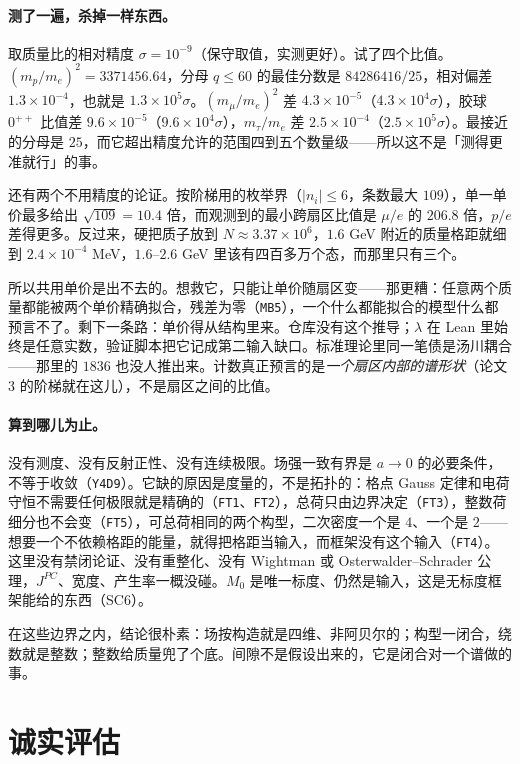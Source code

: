 \documentclass[aps,prd,preprint,superscriptaddress,amsmath,amssymb]{revtex4-2}
\begin{document}
\paragraph{测了一遍，杀掉一样东西。}
取质量比的相对精度 $\sigma=10^{-9}$（保守取值，实测更好）。试了四个比值。$(m_p/m_e)^2=3371456.64$，分母 $q\le60$ 的最佳分数是 $84286416/25$，相对偏差 $1.3\times10^{-4}$，也就是 $1.3\times10^{5}\sigma$。$(m_\mu/m_e)^2$ 差 $4.3\times10^{-5}$（$4.3\times10^{4}\sigma$），胶球 $0^{++}$ 比值差 $9.6\times10^{-5}$（$9.6\times10^{4}\sigma$），$m_\tau/m_e$ 差 $2.5\times10^{-4}$（$2.5\times10^{5}\sigma$）。最接近的分母是 $25$，而它超出精度允许的范围四到五个数量级——所以这不是「测得更准就行」的事。

还有两个不用精度的论证。按阶梯用的枚举界（$|n_i|\le6$，条数最大 $109$），单一单价最多给出 $\sqrt{109}=10.4$ 倍，而观测到的最小跨扇区比值是 $\mu/e$ 的 $206.8$ 倍，$p/e$ 差得更多。反过来，硬把质子放到 $N\approx3.37\times10^{6}$，$1.6$ GeV 附近的质量格距就细到 $2.4\times10^{-4}$ MeV，$1.6$--$2.6$ GeV 里该有四百多万个态，而那里只有三个。

所以共用单价是出不去的。想救它，只能让单价随扇区变——那更糟：任意两个质量都能被两个单价精确拟合，残差为零（\texttt{MB5}），一个什么都能拟合的模型什么都预言不了。剩下一条路：单价得从结构里来。仓库没有这个推导；$\lambda$ 在 Lean 里始终是任意实数，验证脚本把它记成第二输入缺口。标准理论里同一笔债是汤川耦合——那里的 $1836$ 也没人推出来。计数真正预言的是\emph{一个扇区内部的谱形状}（论文 3 的阶梯就在这儿），不是扇区之间的比值。

\paragraph{算到哪儿为止。}
没有测度、没有反射正性、没有连续极限。场强一致有界是 $a\to0$ 的必要条件，不等于收敛（\texttt{Y4D9}）。它缺的原因是度量的，不是拓扑的：格点 Gauss 定律和电荷守恒不需要任何极限就是精确的（\texttt{FT1}、\texttt{FT2}），总荷只由边界决定（\texttt{FT3}），整数荷细分也不会变（\texttt{FT5}），可总荷相同的两个构型，二次密度一个是 $4$、一个是 $2$——想要一个不依赖格距的能量，就得把格距当输入，而框架没有这个输入（\texttt{FT4}）。这里没有禁闭论证、没有重整化、没有 Wightman 或 Osterwalder--Schrader 公理，$J^{PC}$、宽度、产生率一概没碰。$M_0$ 是唯一标度、仍然是输入，这是无标度框架能给的东西（SC6）。

在这些边界之内，结论很朴素：场按构造就是四维、非阿贝尔的；构型一闭合，绕数就是整数；整数给质量兜了个底。间隙不是假设出来的，它是闭合对一个谱做的事。

\section{诚实评估}
\label{sec:honest}
\end{document}

